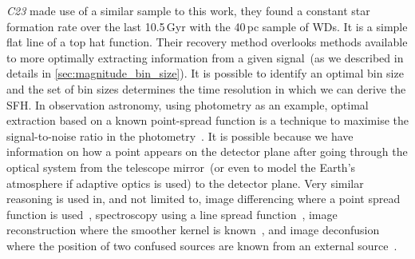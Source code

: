 \documentclass[fleqn,usenatbib]{mnras}
\begin{document}


\textit{C23} made use of a similar sample to this work, they found a constant
star formation rate over the last 10.5\,Gyr with the 40\,pc sample of WDs.
It is a simple flat line of a top hat function. Their recovery method overlooks
methods available to more optimally extracting information from a given
signal~(as we described in details in \ref{sec:magnitude_bin_size}). It is 
possible to identify an optimal bin size and the set of bin sizes determines
the time resolution in which we can derive the SFH. In observation astronomy,
using photometry as an example, optimal extraction based on a known
point-spread function is a technique to maximise the signal-to-noise ratio in
the photometry~\citep{1980SPIE..264..171T, 1987PASP...99..191S}. It is possible
because we have information on how a point appears on the detector plane after 
going through the optical system from the telescope mirror~(or even to model
the Earth's atmosphere if adaptive optics is used) to the detector plane. Very 
similar reasoning is used in, and not limited to, image differencing where a
point spread function is used~\citep{1998ApJ...503..325A, 2008MNRAS.386L..77B, 
2009MNRAS.397.2099A, 2016ApJ...830...27Z}, spectroscopy using a line spread
function~\citep{1986PASP...98..609H, 1989PASP..101.1032M, 2003PASP..115..688K},
image reconstruction where the smoother kernel is
known~\citep{1972JOSA...62...55R, 1974AJ.....79..745L}, and image
deconfusion where the position of two confused sources are known from an
external source~\citep{2015A&A...582A..15M}.
\end{document}
